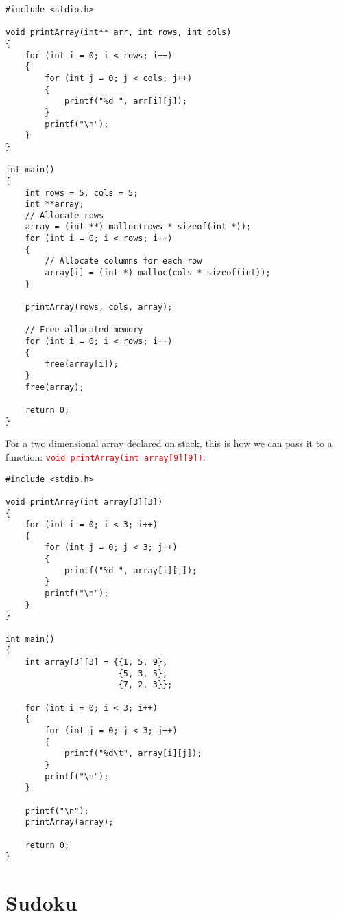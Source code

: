 \documentclass[12pt]{article}
\begin{document}
\begin{verbatim}
#include <stdio.h>

void printArray(int** arr, int rows, int cols)
{
    for (int i = 0; i < rows; i++)
    {
        for (int j = 0; j < cols; j++)
        {
            printf("%d ", arr[i][j]);
        }
        printf("\n");
    }
}

int main()
{
    int rows = 5, cols = 5;
    int **array;
    // Allocate rows
    array = (int **) malloc(rows * sizeof(int *));
    for (int i = 0; i < rows; i++)
    {
        // Allocate columns for each row
        array[i] = (int *) malloc(cols * sizeof(int));
    }

    printArray(rows, cols, array);

    // Free allocated memory
    for (int i = 0; i < rows; i++)
    {
        free(array[i]);
    }
    free(array);
    
    return 0;
}
\end{verbatim}

\newpage

\noindent For a two dimensional array declared on stack, this is how we can pass it to a function: \textcolor{red}{\texttt{void printArray(int array[9][9])}}. \\

\begin{verbatim}
#include <stdio.h>

void printArray(int array[3][3])
{
    for (int i = 0; i < 3; i++)
    {
        for (int j = 0; j < 3; j++)
        {
            printf("%d ", array[i][j]);
        }
        printf("\n");
    }
}

int main()
{
    int array[3][3] = {{1, 5, 9}, 
                       {5, 3, 5}, 
                       {7, 2, 3}};

    for (int i = 0; i < 3; i++)
    {
        for (int j = 0; j < 3; j++)
        {
            printf("%d\t", array[i][j]);
        }
        printf("\n");
    }

	printf("\n");
	printArray(array);

    return 0;
}
\end{verbatim}

\newpage

\newpage
{}
\section*{Sudoku}
\end{document}
